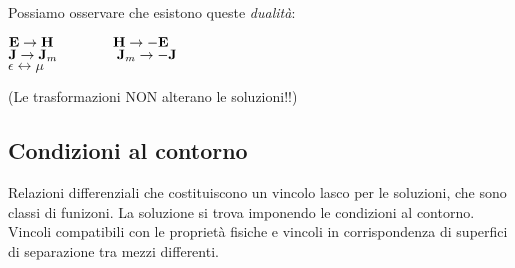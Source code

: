\documentclass[a4paper]{article}
\let\oldoiint\oiint
\renewcommand{\oiint}{\oldoiint\limits}
\begin{document}
Possiamo osservare che esistono queste \emph{dualità}:
\begin{center}
$\textbf{E}\rightarrow\textbf{H}\hspace{15mm}\textbf{H}\rightarrow -\textbf{E}$\\
$\textbf{J}\rightarrow\textbf{J}_m\hspace{15mm}\textbf{J}_m\rightarrow -\textbf{J}$\\
$\epsilon\longleftrightarrow\mu$\\
\end{center}
(Le trasformazioni NON alterano le soluzioni!!)\\
\subsection*{Condizioni al contorno}
Relazioni differenziali che costituiscono un vincolo lasco per le soluzioni, che sono classi di funizoni. La soluzione si trova imponendo le condizioni al contorno. Vincoli compatibili con le proprietà fisiche e vincoli in corrispondenza di superfici di separazione tra mezzi differenti.\\\\
\end{document}
